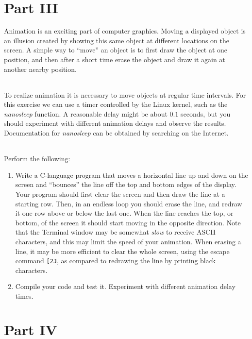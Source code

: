 \documentclass[epsfig,10pt,fullpage]{article}
\begin{document}
\newpage
\noindent
\section*{Part III}

\noindent
Animation is an exciting part of computer graphics. Moving a displayed object is an illusion 
created by showing this same object at different locations on the screen. A simple way to
``move'' an object is to first draw the object at one position, and then after a short time erase 
the object and draw it again at another nearby position.

~\\
\noindent
To realize animation it is necessary to move objects at regular time intervals. For this
exercise we can use a timer controlled by the Linux kernel, such as the {\it nanosleep}
function. A reasonable delay might be about $0.1$ seconds, but you should experiment with 
different animation delays and observe the results. Documentation for {\it nanosleep} can be 
obtained by searching on the Internet.

~\\
\noindent
Perform the following:

\begin{enumerate}

\item Write a C-language program that moves a horizontal line up and down on the screen and 
``bounces'' the line off the top and bottom edges of the display. Your program should first 
clear the screen and then draw the line at a starting row. Then, in an endless loop you should
erase the line, and redraw it one row above or below the last one. When the line reaches the 
top, or bottom, of the screen it should start moving in the opposite direction. Note that
the Terminal window may be somewhat {\it slow} to receive ASCII characters, and this may
limit the speed of your animation. When erasing a line, it may be more efficient to clear the
whole screen, using the escape command \texttt{[2J}, as compared to redrawing the line by
printing black characters.

\item Compile your code and test it. Experiment with different animation delay times.
\end{enumerate}
\noindent
\section*{Part IV}
\end{document}
